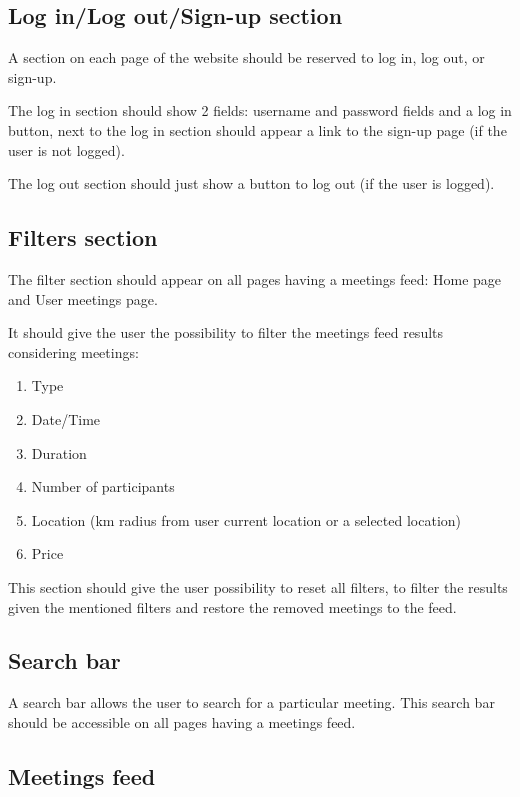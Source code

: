 \documentclass[conference]{IEEEtran}
\begin{document}
\subsection{Log in/Log out/Sign-up section}

A section on each page of the website should be reserved to log in, log out, or sign-up. 

The log in section should show 2 fields: username and password fields and a log in button, next to the log in section should appear a link to the sign-up page (if the user is not logged). 

The log out section should just show a button to log out (if the user is logged).

\subsection{Filters section}

The filter section should appear on all pages having a meetings feed: Home page and User meetings page.

It should give the user the possibility to filter the meetings feed results considering meetings:

\begin{enumerate}
    \item Type
    \item Date/Time
    \item Duration
    \item Number of participants
    \item Location (km radius from user current location or a selected location)
    \item Price
\end{enumerate}

This section should give the user possibility to reset all filters, to filter the results given the mentioned filters and restore the removed meetings to the feed.

\subsection{Search bar}

A search bar allows the user to search for a particular meeting. 
This search bar should be accessible on all pages having a meetings feed.

\subsection{Meetings feed}
\end{document}
